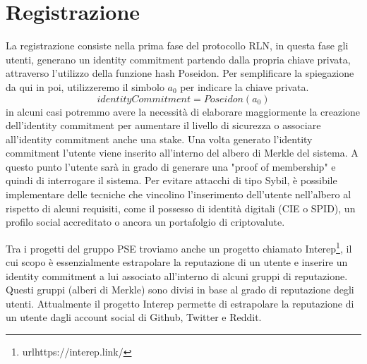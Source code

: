 \section{Registrazione}
La registrazione consiste nella prima fase del protocollo RLN, in questa fase gli utenti, generano un identity
commitment partendo dalla propria chiave privata, attraverso l'utilizzo della funzione hash Poseidon. Per semplificare
la spiegazione da qui in poi, utilizzeremo il simbolo $a_0$ per indicare la chiave privata.
$$identityCommitment = Poseidon(a_0)$$ in alcuni casi potremmo avere la necessità di elaborare maggiormente la creazione
dell'identity commitment per aumentare il livello di sicurezza o associare all'identity commitment anche una stake. Una
volta generato l'identity commitment l'utente viene inserito all'interno del albero di Merkle del sistema. A questo
punto l'utente sarà in grado di generare una "proof of membership" e quindi di interrogare il sistema. Per evitare
attacchi di tipo Sybil, è possibile implementare delle tecniche che vincolino l'inserimento dell'utente nell'albero al
rispetto di alcuni requisiti, come il possesso di identità digitali (CIE o SPID), un profilo social accreditato o ancora
un portafolgio di criptovalute.

Tra i progetti del gruppo PSE troviamo anche un progetto chiamato Interep\footnote{url{https://interep.link/}}, il cui
scopo è essenzialmente estrapolare la reputazione di un utente e inserire un identity commitment a lui associato
all'interno di alcuni gruppi di reputazione. Questi gruppi (alberi di Merkle) sono divisi in base al grado di
reputazione degli utenti. Attualmente il progetto Interep permette di estrapolare la reputazione di un utente dagli
account social di Github, Twitter e Reddit.